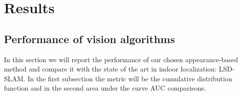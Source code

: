 \section{Results}
\label{sec:results}

\subsection{Performance of vision algorithms}
In this section we will report the performance of our chosen appearance-based method and compare it with the state of the art in indoor localization: LSD-SLAM. In the first subsection the metric will be the cumulative distribution function and in the second area under the curve AUC comparisons.

%
%
%	
%
%
%

